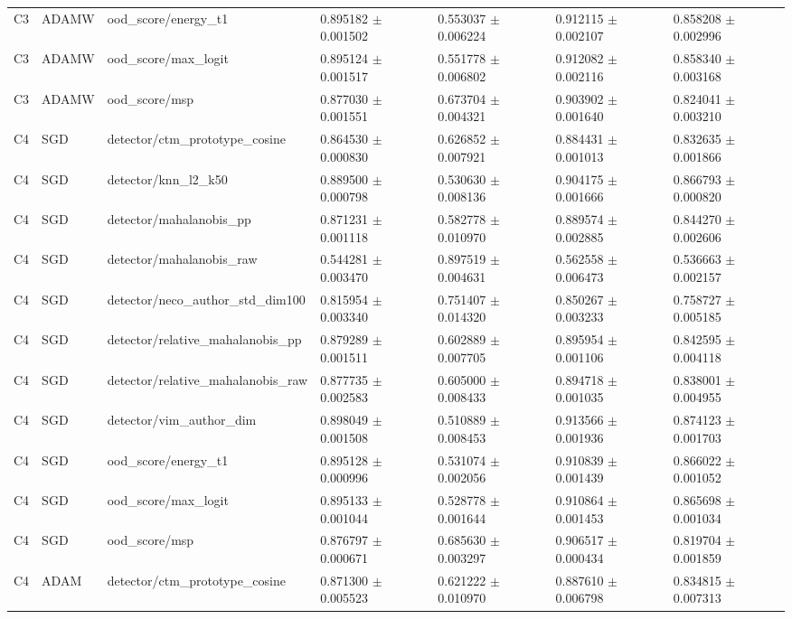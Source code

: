 \begin{longtable}{lllllll}
C3 & ADAMW & ood\_score/energy\_t1 & 0.895182 $\pm$ 0.001502 & 0.553037 $\pm$ 0.006224 & 0.912115 $\pm$ 0.002107 & 0.858208 $\pm$ 0.002996 \\
C3 & ADAMW & ood\_score/max\_logit & 0.895124 $\pm$ 0.001517 & 0.551778 $\pm$ 0.006802 & 0.912082 $\pm$ 0.002116 & 0.858340 $\pm$ 0.003168 \\
C3 & ADAMW & ood\_score/msp & 0.877030 $\pm$ 0.001551 & 0.673704 $\pm$ 0.004321 & 0.903902 $\pm$ 0.001640 & 0.824041 $\pm$ 0.003210 \\
C4 & SGD & detector/ctm\_prototype\_cosine & 0.864530 $\pm$ 0.000830 & 0.626852 $\pm$ 0.007921 & 0.884431 $\pm$ 0.001013 & 0.832635 $\pm$ 0.001866 \\
C4 & SGD & detector/knn\_l2\_k50 & 0.889500 $\pm$ 0.000798 & 0.530630 $\pm$ 0.008136 & 0.904175 $\pm$ 0.001666 & 0.866793 $\pm$ 0.000820 \\
C4 & SGD & detector/mahalanobis\_pp & 0.871231 $\pm$ 0.001118 & 0.582778 $\pm$ 0.010970 & 0.889574 $\pm$ 0.002885 & 0.844270 $\pm$ 0.002606 \\
C4 & SGD & detector/mahalanobis\_raw & 0.544281 $\pm$ 0.003470 & 0.897519 $\pm$ 0.004631 & 0.562558 $\pm$ 0.006473 & 0.536663 $\pm$ 0.002157 \\
C4 & SGD & detector/neco\_author\_std\_dim100 & 0.815954 $\pm$ 0.003340 & 0.751407 $\pm$ 0.014320 & 0.850267 $\pm$ 0.003233 & 0.758727 $\pm$ 0.005185 \\
C4 & SGD & detector/relative\_mahalanobis\_pp & 0.879289 $\pm$ 0.001511 & 0.602889 $\pm$ 0.007705 & 0.895954 $\pm$ 0.001106 & 0.842595 $\pm$ 0.004118 \\
C4 & SGD & detector/relative\_mahalanobis\_raw & 0.877735 $\pm$ 0.002583 & 0.605000 $\pm$ 0.008433 & 0.894718 $\pm$ 0.001035 & 0.838001 $\pm$ 0.004955 \\
C4 & SGD & detector/vim\_author\_dim & 0.898049 $\pm$ 0.001508 & 0.510889 $\pm$ 0.008453 & 0.913566 $\pm$ 0.001936 & 0.874123 $\pm$ 0.001703 \\
C4 & SGD & ood\_score/energy\_t1 & 0.895128 $\pm$ 0.000996 & 0.531074 $\pm$ 0.002056 & 0.910839 $\pm$ 0.001439 & 0.866022 $\pm$ 0.001052 \\
C4 & SGD & ood\_score/max\_logit & 0.895133 $\pm$ 0.001044 & 0.528778 $\pm$ 0.001644 & 0.910864 $\pm$ 0.001453 & 0.865698 $\pm$ 0.001034 \\
C4 & SGD & ood\_score/msp & 0.876797 $\pm$ 0.000671 & 0.685630 $\pm$ 0.003297 & 0.906517 $\pm$ 0.000434 & 0.819704 $\pm$ 0.001859 \\
C4 & ADAM & detector/ctm\_prototype\_cosine & 0.871300 $\pm$ 0.005523 & 0.621222 $\pm$ 0.010970 & 0.887610 $\pm$ 0.006798 & 0.834815 $\pm$ 0.007313 \\

\end{longtable}
